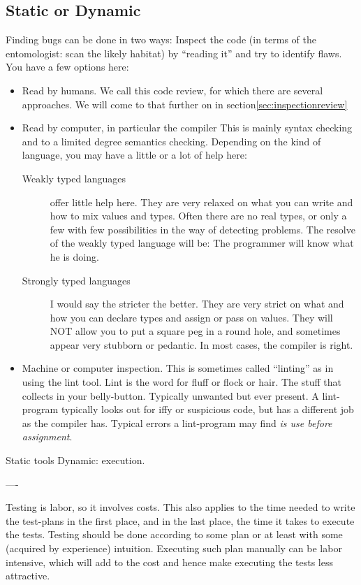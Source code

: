 \documentclass[\docroot/main]{subfiles}
\begin{document}
\subsection{Static or Dynamic}
Finding bugs can be done in two ways: Inspect the code (in terms of
the entomologist: scan the likely habitat) by ``reading it'' and try
to identify flaws. You have a few options here:
\begin{itemize}
\item Read by humans. We call this code review, for which there are
  several approaches. We will come to that further on in section\ref{sec:inspectionreview}
\item Read by computer, in particular the compiler This is mainly syntax checking and to a
  limited degree semantics checking. Depending on the kind of
  language, you may have a little or a lot of help here:
  \begin{description}
  \item[Weakly typed languages] offer little help here. They are very
    relaxed on what you can write and how to mix values and
    types. Often there are no real types, or only a few with few
    possibilities in the way of detecting problems. The resolve of the
    weakly typed language will be: The programmer will know what he is
    doing.
  \item[Strongly typed languages] I would say the stricter the
    better. They are very strict on what and how you can declare types
    and assign or pass on values. They will NOT allow you to put a
    square peg in a round hole, and sometimes appear very stubborn or
    pedantic. In most cases, the compiler is right.
  \end{description}
\item Machine or computer inspection. This is sometimes called
  ``linting'' as in using the lint tool. Lint is the word for fluff or
  flock or hair. The stuff that collects in your 
  belly-button. Typically unwanted but ever present. A lint-program
  typically looks out for iffy or suspicious code, but has a different
  job as the compiler has. Typical errors a lint-program may find
  \textit{is use before assignment}.
\end{itemize}


Static tools
Dynamic: execution.

----

Testing is labor, so it involves costs. This also applies to the
time needed to write the test-plans in the first place, and in the last
place, the time it takes to execute the tests. Testing should be done
according to some plan or at least with some (acquired by experience)
intuition. Executing such plan manually can be labor intensive, which
will add to the cost and hence make executing the tests less attractive.
\end{document}
